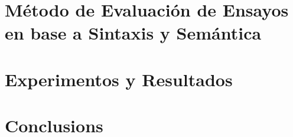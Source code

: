 \documentclass[12pt]{diicc}
\begin{document}
% 
\chapter{Método de Evaluación de Ensayos en base a Sintaxis y Semántica}\label{chap:contributions}

\chapter{Experimentos y Resultados}\label{chap:experiments}
%
% 
\chapter{Conclusions}\label{chap:conclusion}
\end{document}
